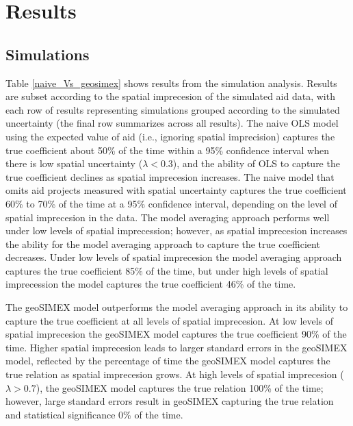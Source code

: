 \section{Results}
\subsection{Simulations}

Table \ref{naive_Vs_geosimex} shows results from the simulation analysis. 
Results are subset according to the spatial imprecesion of the simulated aid data, with each row of results representing simulations grouped according to the simulated uncertainty (the final row summarizes across all results). 
The naive OLS model using the expected value of aid (i.e., ignoring spatial imprecision) captures the true coefficient about 50\% of the time within a 95\% confidence interval when there is low spatial uncertainty ($\lambda < 0.3$), and the ability of OLS to capture the true coefficient declines as spatial imprecesion increases. 
The naive model that omits aid projects measured with spatial uncertainty captures the true coefficient 60\% to 70\% of the time at a 95\% confidence interval, depending on the level of spatial imprecesion in the data. 
The model averaging approach performs well under low levels of spatial imprecession; however, as spatial imprecesion increases the ability for the model averaging approach to capture the true coefficient decreases. 
Under low levels of spatial imprecesion the model averaging approach captures the true coefficient 85\% of the time, but under high levels of spatial imprecession the model captures the true coefficient 46\% of the time. 
\par
The geoSIMEX model outperforms the model averaging approach in its ability to capture the true coefficient at all levels of spatial imprecesion.
At low levels of spatial imprecesion the geoSIMEX model captures the true coefficient 90\% of the time. 
Higher spatial imprecesion leads to larger standard errors in the geoSIMEX model, reflected by the percentage of time the geoSIMEX model captures the true relation as spatial imprecesion grows. 
At high levels of spatial imprecesion ($\lambda > 0.7$), the geoSIMEX model captures the true relation 100\% of the time; however, large standard errors result in geoSIMEX capturing the true relation and statistical significance 0\% of the time.

